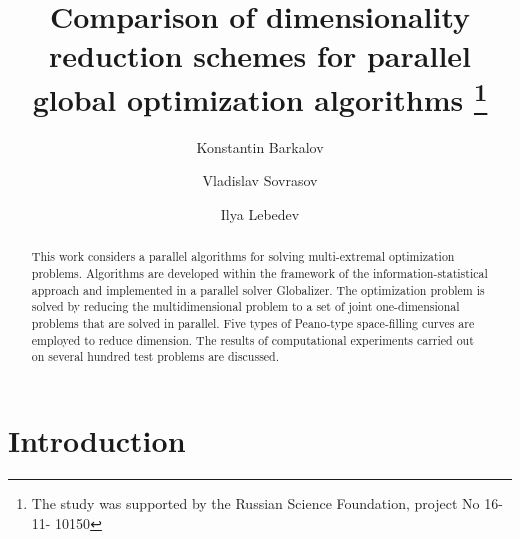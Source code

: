 \documentclass[runningheads]{llncs}
\begin{document}
\setlength{\abovedisplayskip}{3pt}
\setlength{\belowdisplayskip}{3pt}
%
\title{Comparison of dimensionality reduction schemes for parallel global optimization
algorithms
\thanks{The study was supported by the Russian Science Foundation, project No 16-11-
10150}}
%
%
\author{Konstantin Barkalov \and
Vladislav Sovrasov \and
Ilya Lebedev}
%
%
%
\maketitle              %
%
\begin{abstract}
This work considers a parallel algorithms for solving multi-extremal optimization problems.
Algorithms are developed within the framework of the information-statistical approach and
implemented in a parallel solver Globalizer. The optimization problem is solved by reducing
the multidimensional problem to a set of joint one-dimensional problems that are solved in
parallel. Five types of Peano-type space-filling curves are employed to reduce dimension. The
results of computational experiments carried out on several hundred test problems are discussed.

\end{abstract}

\section{Introduction}\label{sec:intro}
\end{document}
